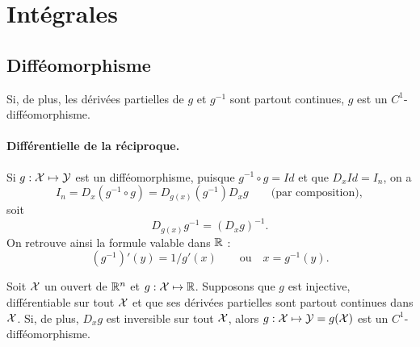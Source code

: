 \section{Intégrales}


% 

\subsection{Difféomorphisme}

\begin{definition*}[Difféomorphisme]
  Si, de plus, les dérivées partielles de $g$ et $g^{-1}$ sont partout continues, $g$ est un $C^1$-difféomorphisme.
\end{definition*}

\paragraph*{Différentielle de la réciproque.}
Si $g : \mathcal{X} \mapsto \mathcal{Y}$ est un difféomorphisme, puisque $g^{-1} \circ g = Id$ et que $D_x Id = I_n$, on a
$$
I_n = D_x(g^{-1} \circ g) = D_{g(x)}(g^{-1}) D_x g 
\qquad \text{(par composition)},
$$
soit
$$
D_{g(x)}g^{-1} = (D_x g)^{-1}.
$$
On retrouve ainsi la formule valable dans $\mathbb{R}$ :
$$
(g^{-1})'(y) = 1 /g'(x)
\qquad \text{ou} \quad x = g^{-1}(y).
$$

\begin{theorem*}
  Soit $\mathcal{X}$ un ouvert de $\mathbb{R}^n$ et $g : \mathcal{X} \mapsto \mathbb{R}$. Supposons que $g$ est injective, différentiable sur tout $\mathcal{X}$ et que ses dérivées partielles sont partout continues dans $\mathcal{X}$. Si, de plus, $D_x g$ est inversible sur tout $\mathcal{X}$, alors $g : \mathcal{X} \mapsto \mathcal{Y} = g(\mathcal{X})$ est un $C^1$-difféomorphisme.
\end{theorem*}

